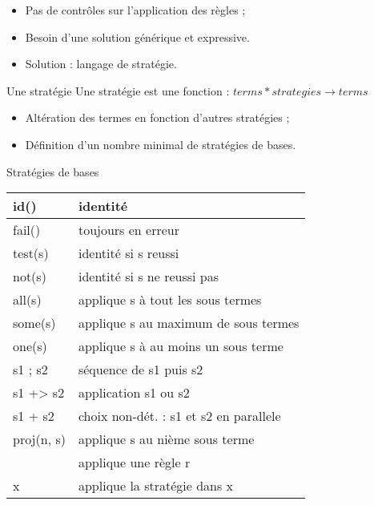 
\begin{frame}{}
\begin{itemize}
\item Pas de contrôles sur l'application des règles ;
\item Besoin d'une solution générique et expressive.
\pause
\item \vspace{0.4cm} Solution : langage de stratégie.
\end{itemize}
\end{frame}

\begin{frame}{Une stratégie}
Une stratégie est une fonction : $ terms * strategies \rightarrow terms $

\begin{itemize}
\item Altération des termes en fonction d'autres stratégies ;
\item Définition d'un nombre minimal de stratégies de bases.
\end{itemize}
\end{frame}

\begin{frame}[fragile]{Stratégies de bases}

{\fontsize{7}{7}

\begin{center}
    \begin{tabular}{ | l | p{6cm}|}
    \hline
    id() & identité \\ \hline
    fail() & toujours en erreur \\ \hline
    test(s) & identité si s reussi \\ \hline
    not(s) & identité si s ne reussi pas \\ \hline
    all(s) & applique s à tout les sous termes \\ \hline
    some(s) & applique s au maximum de sous termes \\ \hline
    one(s) & applique s à au moins un sous terme  \\ \hline
    s1 ; s2 & séquence de s1 puis s2 \\ \hline
    s1 +> s2 & application s1 ou s2 \\ \hline
    s1 + s2 & choix non-dét. : s1 et s2 en parallele \\ \hline 
    proj(n, s) & applique s au nième sous terme \\ \hline
    [r] & applique une règle r \\ \hline
    x & applique la stratégie dans x \\ \hline
    \end{tabular}
\end{center}
}
\end{frame}

